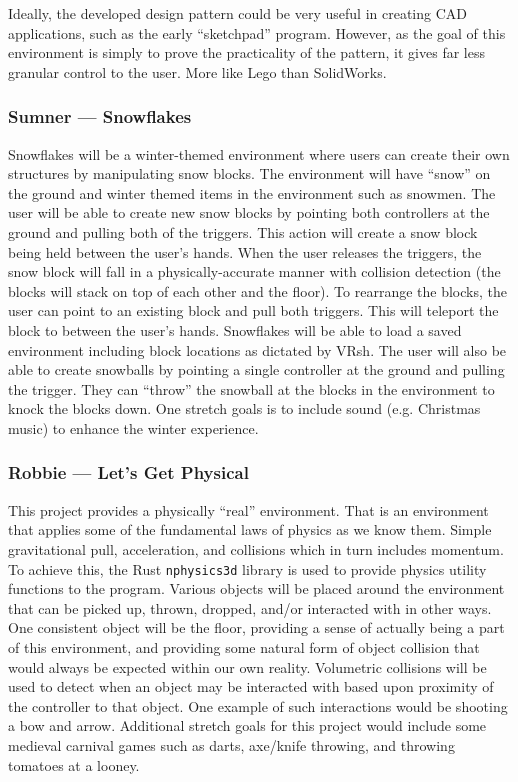 \documentclass[titlepage,12pt]{article}
\begin{document}
Ideally, the developed design pattern could be very useful in creating CAD
applications, such as the early ``sketchpad'' program. However, as the goal of
this environment is simply to prove the practicality of the pattern, it gives
far less granular control to the user. More like Lego than SolidWorks.

\subsubsection{Sumner --- Snowflakes}
Snowflakes will be a winter-themed environment where users can create their own
structures by manipulating snow blocks. The environment will have ``snow'' on
the ground and winter themed items in the environment such as snowmen. The user
will be able to create new snow blocks by pointing both controllers at the
ground and pulling both of the triggers. This action will create a snow block
being held between the user's hands. When the user releases the triggers, the
snow block will fall in a physically-accurate manner with collision detection
(the blocks will stack on top of each other and the floor). To rearrange the
blocks, the user can point to an existing block and pull both triggers. This
will teleport the block to between the user's hands. Snowflakes will be able to
load a saved environment including block locations as dictated by VRsh. The user
will also be able to create snowballs by pointing a single controller at the
ground and pulling the trigger. They can ``throw'' the snowball at the blocks in
the environment to knock the blocks down. One stretch goals is to include sound
(e.g. Christmas music) to enhance the winter experience.

\subsubsection{Robbie --- Let's Get Physical}
This project provides a physically ``real'' environment.  That is an environment
that applies some of the fundamental laws of physics as we know them. Simple
gravitational pull, acceleration, and collisions which in turn includes
momentum. To achieve this, the Rust \texttt{nphysics3d} library is used to
provide physics utility functions to the program.  Various objects will be
placed around the environment that can be picked up, thrown, dropped, and/or
interacted with in other ways. One consistent object will be the floor, providing
a sense of actually being a part of this environment, and providing some natural 
form of object collision that would always be expected within our own reality. 
Volumetric collisions will be used to detect when an object may be interacted with
based upon proximity of the controller to that object. One example of such 
interactions would be shooting a bow and arrow. Additional stretch goals for this 
project would include some medieval carnival games such as darts, axe/knife 
throwing, and throwing tomatoes at a looney.
\end{document}
